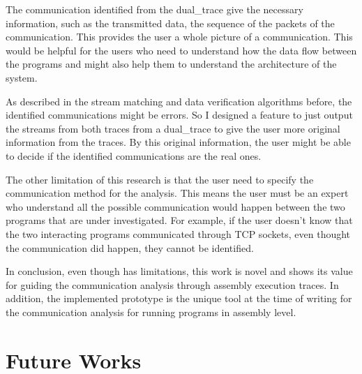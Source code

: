 The communication identified from the dual\_trace give the necessary information, such as the transmitted data, the sequence of the packets of the communication. This provides the user a whole picture of a communication. This would be helpful for the users who need to understand how the data flow between the programs and might also help them to understand the architecture of the system. 

As described in the stream matching and  data verification algorithms before, the identified communications might be errors. So I designed a feature to just output the streams from both traces from a dual\_trace to give the user more original information from the traces. By this original information, the user might be able to decide if the identified communications are the real ones.

The other limitation of this research is that the user need to specify the communication method for the analysis. This means the user must be an expert who understand all the possible communication would happen between the two programs that are under investigated. For example, if the user doesn't know that the two interacting programs communicated through TCP sockets, even thought the communication did happen, they cannot be identified. 

In conclusion, even though has limitations, this work is novel and shows its value for guiding the communication analysis through assembly execution traces. In addition, the implemented prototype is the unique tool at the time of writing for the communication analysis for running programs in assembly level.

\section{Future Works}

